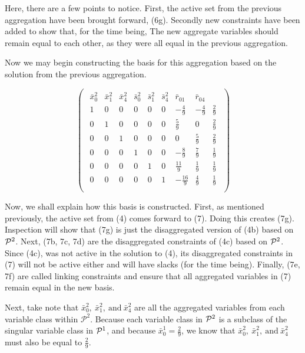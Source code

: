 \documentclass[11pt]{article} %
\newcommand{\cP}{{\cal P}}
\begin{document}
	Here, there are a few points to notice.  First, the active set from the previous aggregation have been brought forward, (6g).  Secondly new constraints have been added to show that, for the time being, The new aggregate variables should remain equal to each other, as they were all equal in the previous aggregation. 
	
	Now we may begin constructing the basis for this aggregation based on the solution from the previous aggregation.
	
	\begin{equation}
	\begin{pmatrix}
	\begin{array}{cccccccc|c}
	\bar{x}^2_0 & \bar{x}^2_1 & \bar{x}^2_4 & \bar{s}^2_0 & \bar{s}^2_1 & \bar{s}^2_4 & \bar{r}_{01} & \bar{r}_{04} \\
	\hline
	1 & 0 & 0 & 0 & 0 & 0 & -\frac{4}{9} & -\frac{4}{9} & \frac{2}{9} \\ 
	0 & 1 & 0 & 0 & 0 & 0 & \frac{5}{9} & 0 & \frac{2}{9} \\ 
	0 & 0 & 1 & 0 & 0 & 0 & 0 & \frac{5}{9} & \frac{2}{9} \\ 
	0 & 0 & 0 & 1 & 0 & 0 & -\frac{8}{9} & \frac{7}{9} & \frac{1}{9} \\ 
	0 & 0 & 0 & 0 & 1 & 0 & \frac{11}{9} & \frac{1}{9} & \frac{1}{9} \\
	0 & 0 & 0 & 0 & 0 & 1 & -\frac{16}{9} & \frac{4}{9} & \frac{1}{9} \\
	\end{array}
	\end{pmatrix}
	\end{equation}
	
	Now, we shall explain how this basis is constructed.  First, as mentioned previously, the active set from (4) comes forward to (7).  Doing this creates (7g).  Inspection will show that (7g) is just the disaggregated version of (4b) based on $\cP^2$. Next, (7b, 7c, 7d) are the disaggregated constraints of (4c) based on $\cP^2$.  Since (4c), was not active in the solution to (4), its disaggregated constraints in (7) will not be active either and will have slacks (for the time being).  Finally, (7e, 7f) are called linking constraints and ensure that all aggregated variables in (7) remain equal in the new basis.
	
	Next, take note that $\bar{x}_0^2, \ \bar{x}_1^2, \ \text{and} \ \bar{x}_4^2$ are all the aggregated variables from each variable class within $\mathcal{P}^2$.  Because each variable class in $\cP^2$ is a subclass of the singular variable class in $\cP^1$, and because $\bar{x}_0^1 = \frac{2}{9}$, we know that $\bar{x}_0^2, \ \bar{x}_1^2, \ \text{and} \ \bar{x}_4^2$ must also be equal to $\frac{2}{9}$.  
	
\end{document}
